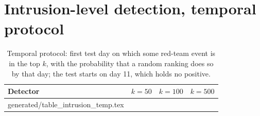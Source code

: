 \documentclass[11pt,a4paper]{article}
\makeatletter
\newcommand{\tablerows}[1]{\@@input #1 }
\makeatother
\begin{document}
\section{Intrusion-level detection, temporal protocol}
\label{app:intrusion}
\begin{table}[H]
\centering
\small
\caption{Temporal protocol: first test day on which some red-team event is in the top $k$, with the probability that a random ranking does so by that day; the test starts on day 11, which holds no positive.}
\label{tab:intrusion-temp}
\begin{tabular}{@{}lrrr@{}}
\toprule
Detector & $k = 50$ & $k = 100$ & $k = 500$ \\
\midrule
\tablerows{generated/table_intrusion_temp.tex}
\bottomrule
\end{tabular}
\end{table}
\end{document}
